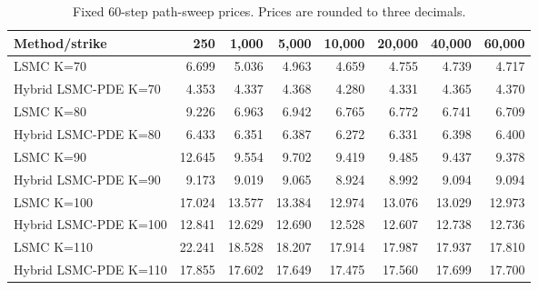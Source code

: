 \begin{table}[htbp]\centering
\caption{Fixed 60-step path-sweep prices. Prices are rounded to three decimals.}
\begin{tabular}{lrrrrrrr}
\toprule
Method/strike & 250 & 1,000 & 5,000 & 10,000 & 20,000 & 40,000 & 60,000 \\
\midrule
LSMC K=70 & 6.699 & 5.036 & 4.963 & 4.659 & 4.755 & 4.739 & 4.717 \\
Hybrid LSMC-PDE K=70 & 4.353 & 4.337 & 4.368 & 4.280 & 4.331 & 4.365 & 4.370 \\
LSMC K=80 & 9.226 & 6.963 & 6.942 & 6.765 & 6.772 & 6.741 & 6.709 \\
Hybrid LSMC-PDE K=80 & 6.433 & 6.351 & 6.387 & 6.272 & 6.331 & 6.398 & 6.400 \\
LSMC K=90 & 12.645 & 9.554 & 9.702 & 9.419 & 9.485 & 9.437 & 9.378 \\
Hybrid LSMC-PDE K=90 & 9.173 & 9.019 & 9.065 & 8.924 & 8.992 & 9.094 & 9.094 \\
LSMC K=100 & 17.024 & 13.577 & 13.384 & 12.974 & 13.076 & 13.029 & 12.973 \\
Hybrid LSMC-PDE K=100 & 12.841 & 12.629 & 12.690 & 12.528 & 12.607 & 12.738 & 12.736 \\
LSMC K=110 & 22.241 & 18.528 & 18.207 & 17.914 & 17.987 & 17.937 & 17.810 \\
Hybrid LSMC-PDE K=110 & 17.855 & 17.602 & 17.649 & 17.475 & 17.560 & 17.699 & 17.700 \\
\bottomrule
\end{tabular}
\end{table}

